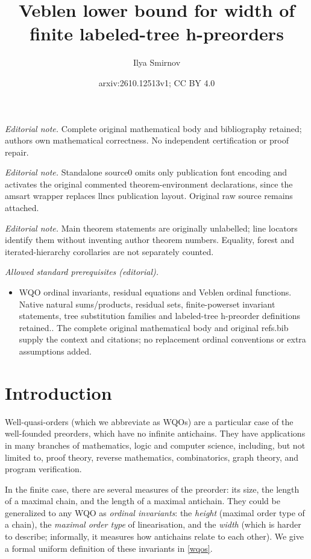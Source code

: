 \documentclass[10pt,a4paper]{amsart}
\title{Veblen lower bound for width of finite labeled-tree h-preorders}
\author{Ilya Smirnov}
\date{arxiv:2610.12513v1; CC BY 4.0}
\begin{document}
\maketitle
\noindent\textit{Editorial note.} Complete original mathematical body and bibliography retained; authors own mathematical correctness. No independent certification or proof repair.\par\medskip
\noindent\textit{Editorial note.} Standalone source0 omits only publication font encoding and activates the original commented theorem-environment declarations, since the amsart wrapper replaces llncs publication layout. Original raw source remains attached.\par\medskip
\noindent\textit{Editorial note.} Main theorem statements are originally unlabelled; line locators identify them without inventing author theorem numbers. Equality, forest and iterated-hierarchy corollaries are not separately counted.\par\medskip
\noindent\textit{Allowed standard prerequisites (editorial).}\begin{itemize}
\item WQO ordinal invariants, residual equations and Veblen ordinal functions. Native natural sums/products, residual sets, finite-powerset invariant statements, tree substitution families and labeled-tree h-preorder definitions retained.. The complete original mathematical body and original refs.bib supply the context and citations; no replacement ordinal conventions or extra assumptions added.
\end{itemize}\medskip
\section{Introduction}

Well-quasi-orders (which we abbreviate as WQOs) are a particular case of the well-founded preorders, which have no infinite antichains. They have applications in many branches of mathematics, logic and computer science, including, but not limited to, proof theory, reverse mathematics, combinatorics, graph theory, and program verification.

In the finite case, there are several measures of the preorder: its size, the length of a maximal chain, and the length of a maximal antichain. They could be generalized to any WQO as \textit{ordinal invariants}: the \textit{height} (maximal order type of a chain), the \textit{maximal order type} of linearisation, and the \textit{width} (which is harder to describe; informally, it measures how antichains relate to each other). We give a formal uniform definition of these invariants in \cref{wqos}.
\end{document}
